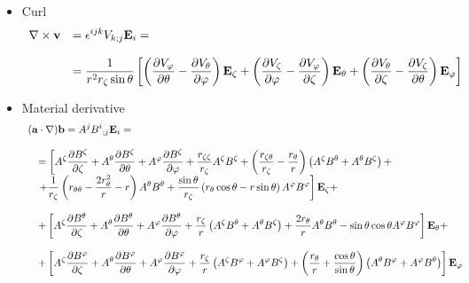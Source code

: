 \begin{itemize}
\begin{itemize}
\item Curl
\begin{equation}
\begin{array}{rl}
\displaystyle \nabla\times\mathbf{v} &
\displaystyle = \epsilon^{ijk}V_{k;j}\mathbf{E}_i=\\
\\
&\displaystyle = \frac{1}{r^2r_\zeta\sin\theta}\left[
\left(\frac{\partial V_\varphi}{\partial\theta}-
\frac{\partial V_\theta}{\partial\varphi}\right)\mathbf{E}_\zeta +
\left(\frac{\partial V_\zeta}{\partial\varphi}-
\frac{\partial V_\varphi}{\partial\zeta}\right)\mathbf{E}_\theta +
\left(\frac{\partial V_\theta}{\partial\zeta}-
\frac{\partial V_\zeta}{\partial\theta}\right)\mathbf{E}_\varphi\right]\\
\end{array}
\end{equation}
\item Material derivative
\begin{equation}
\begin{array}{l}
\displaystyle(\mathbf{a}\cdot\nabla)\mathbf{b}
 =A^j{B^i}_{;j}\mathbf{E}_i=\\
\\
\quad\displaystyle =\left[A^\zeta\frac{\partial B^\zeta}{\partial\zeta}+
A^\theta\frac{\partial B^\zeta}{\partial\theta}+A^\varphi\frac{\partial B^\zeta}{\partial\varphi}
+\frac{r_{\zeta\zeta}}{r_\zeta}A^\zeta B^\zeta+\left(\frac{r_{\zeta\theta}}{r_\zeta}-\frac{r_\theta}{r}
\right)\left(A^\zeta B^\theta+A^\theta B^\zeta\right)+\right.\\
\quad\displaystyle \left. +\frac{1}{r_\zeta}\left(r_{\theta\theta}-
\frac{2r_\theta^2}{r}-r\right)A^\theta B^\theta+\frac{\sin\theta}{r_\zeta}\left(
r_\theta\cos\theta-r\sin\theta\right)A^\varphi B^{\varphi}\right]\mathbf{E}_\zeta +\\
\\
\quad\displaystyle +\left[A^\zeta\frac{\partial B^\theta}{\partial\zeta}+
A^\theta\frac{\partial B^\theta}{\partial\theta}+A^\varphi\frac{\partial B^\theta}{\partial\varphi}
+\frac{r_\zeta}{r}\left(A^\zeta B^\theta+A^\theta B^\zeta\right)
+\frac{2r_\theta}{r}A^\theta B^\theta-
\sin\theta\cos\theta A^\varphi B^{\varphi}\right]\mathbf{E}_\theta +\\
\\
\quad\displaystyle +\left[A^\zeta\frac{\partial B^\varphi}{\partial\zeta}+
A^\theta\frac{\partial B^\varphi}{\partial\theta}+A^\varphi\frac{\partial B^\varphi}{\partial\varphi}
+\frac{r_\zeta}{r}\left(A^\zeta B^\varphi+A^\varphi B^\zeta\right)
+\left(\frac{r_\theta}{r}+\frac{\cos\theta}{\sin\theta}\right)
\left(A^\theta B^\varphi+A^\varphi B^\theta\right)\right]\mathbf{E}_\varphi\\
\end{array}
\end{equation}
\end{itemize}


\end{itemize}
